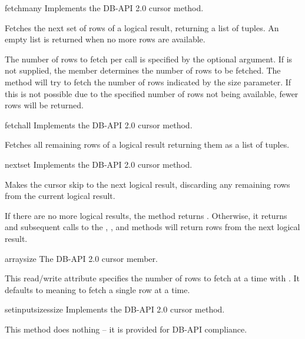 \begin{methoddesc}[Cursor]{fetchmany}{}
Implements the DB-API 2.0 cursor  method.

Fetches the next set of rows of a logical result, returning a list of
tuples. An empty list is returned when no more rows are available.

The number of rows to fetch per call is specified by the optional
 argument.  If  is not supplied, the
 member determines the number of rows to be
fetched.  The method will try to fetch the number of rows indicated by
the size parameter.  If this is not possible due to the specified
number of rows not being available, fewer rows will be returned.
\end{methoddesc}

\begin{methoddesc}[Cursor]{fetchall}{}
Implements the DB-API 2.0 cursor  method.

Fetches all remaining rows of a logical result returning them as a
list of tuples.
\end{methoddesc}

\begin{methoddesc}[Cursor]{nextset}{}
Implements the DB-API 2.0 cursor  method.

Makes the cursor skip to the next logical result, discarding any
remaining rows from the current logical result.

If there are no more logical results, the method returns .
Otherwise, it returns  and subsequent calls to the
, , and 
methods will return rows from the next logical result.
\end{methoddesc}

\begin{memberdesc}[Cursor]{arraysize}
The DB-API 2.0 cursor  member.

This read/write attribute specifies the number of rows to fetch at a
time with .  It defaults to  meaning to
fetch a single row at a time.
\end{memberdesc}

\begin{methoddesc}[Cursor]{setinputsizes}{size}
Implements the DB-API 2.0 cursor  method.

This method does nothing -- it is provided for DB-API compliance.
\end{methoddesc}

